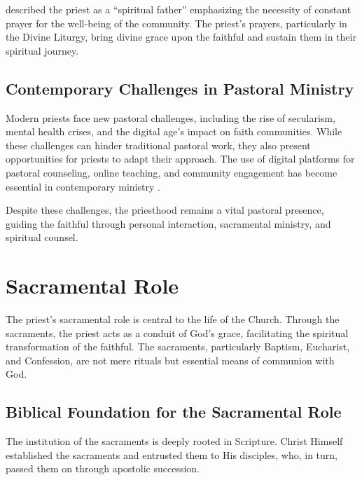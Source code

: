 \documentclass[12pt, doc]{apa7}   	%
\begin{document}
\citet{priests_zacharias} described the priest as a ``spiritual father'' emphasizing the necessity of constant prayer for the well-being of the community. The priest’s prayers, particularly in the Divine Liturgy, bring divine grace upon the faithful and sustain them in their spiritual journey.

\subsection{Contemporary Challenges in Pastoral Ministry}

Modern priests face new pastoral challenges, including the rise of secularism, mental health crises, and the digital age’s impact on faith communities. While these challenges can hinder traditional pastoral work, they also present opportunities for priests to adapt their approach. The use of digital platforms for pastoral counseling, online teaching, and community engagement has become essential in contemporary ministry \citep{orthodox_church_ware}. 

Despite these challenges, the priesthood remains a vital pastoral presence, guiding the faithful through personal interaction, sacramental ministry, and spiritual counsel.

\section{Sacramental Role}\label{sacramental}

The priest’s sacramental role is central to the life of the Church. Through the sacraments, the priest acts as a conduit of God’s grace, facilitating the spiritual transformation of the faithful. The sacraments, particularly Baptism, Eucharist, and Confession, are not mere rituals but essential means of communion with God.

\subsection{Biblical Foundation for the Sacramental Role}

The institution of the sacraments is deeply rooted in Scripture. Christ Himself established the sacraments and entrusted them to His disciples, who, in turn, passed them on through apostolic succession. 
\end{document}
